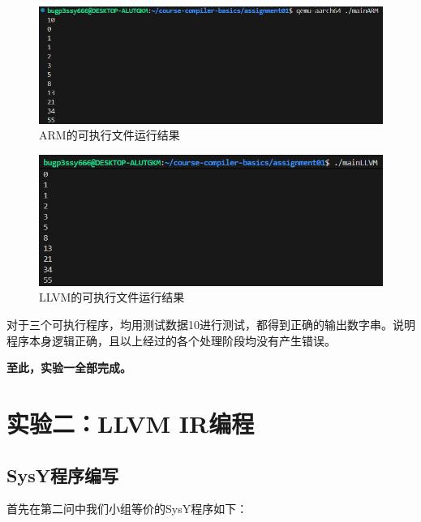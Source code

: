 \documentclass[UTF8,a4paper,10pt]{ctexart}
\begin{document}
\begin{figure} [H]
    \centering
    \includegraphics[width=0.75\linewidth]{res_arm.png}
    \caption{ARM的可执行文件运行结果}
    \label{fig:placeholder}
\end{figure}

\begin{figure}[H]
    \centering
    \includegraphics[width=0.75\linewidth]{run_2.png}
    \caption{LLVM的可执行文件运行结果}
    \label{fig:placeholder}
\end{figure}

对于三个可执行程序，均用测试数据10进行测试，都得到正确的输出数字串。说明程序本身逻辑正确，且以上经过的各个处理阶段均没有产生错误。

\vspace{2em}

\textbf{\large{至此，实验一全部完成。}}


\vspace{3em}

\section{实验二：LLVM IR编程}

\subsection{SysY程序编写} \label{this-subsection}

首先在第二问中我们小组等价的SysY程序如下：
\end{document}
